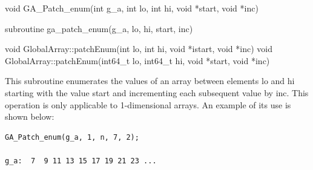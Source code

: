 \documentclass[10pt]{article}
\begin{document}

\begin{capi}
\begin{ccode}
void GA_Patch_enum(int g_a, int lo, int hi, void *start, void *inc)
\end{ccode}
\begin{funcargs}
\end{funcargs}
\end{capi}

\begin{fapi}
\begin{fcode}
subroutine ga_patch_enum(g_a, lo, hi, start, inc)
\end{fcode}
\begin{funcargs}
\end{funcargs}
\end{fapi}

\begin{cxxapi}
\begin{cxxcode}
void GlobalArray::patchEnum(int lo, int hi, void *istart, void *inc)
void GlobalArray::patchEnum(int64_t lo, int64_t hi, void *start, void *inc)
\end{cxxcode}
\begin{funcargs}
\end{funcargs}
\end{cxxapi}

\gcoll

\begin{desc}
This subroutine enumerates the values of an array between elements lo and hi
starting with the value start and incrementing each subsequent value by inc.
This operation is only applicable to 1-dimensional arrays. An example of its
use is shown below:
\begin{verbatim}
GA_Patch_enum(g_a, 1, n, 7, 2);

g_a:  7  9 11 13 15 17 19 21 23 ...
\end{verbatim}
\end{desc}
\end{document}
